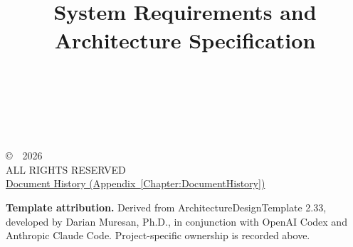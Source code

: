 \title{\ProjectName\\[0.5em]\large System Requirements and\\Architecture Specification\\[1.5em]\normalsize\VERSION\\\DocumentStatus}
\author{\DocumentAuthors\\\Organization}
\conferraldate{}{\DocumentDate}
\copyrightholder{\Organization}
\maketitle

\begin{copyrightpage}
\copyright\ \Organization\ 2026 \\
ALL RIGHTS RESERVED \\[0.2in]
\hyperref[Chapter:DocumentHistory]{Document History (Appendix~\ref*{Chapter:DocumentHistory})}

\vspace{0.4in}
\noindent\textbf{Template attribution.}
Derived from ArchitectureDesignTemplate 2.33, developed by
Darian Muresan, Ph.D., in conjunction with OpenAI Codex and
Anthropic Claude Code. Project-specific ownership is recorded above.
\end{copyrightpage}

\begin{abstract}
  
\end{abstract}

\contentspage
\tablelistpage
\figurelistpage
